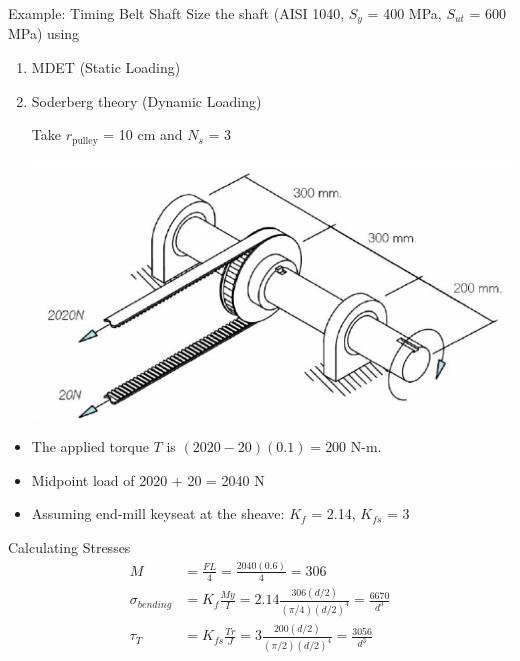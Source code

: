 \documentclass[10pt, svgnames]{beamer}
\begin{document}
\begin{frame}[label={sec:org0fe2dbf}]{Example: Timing Belt Shaft}
Size the shaft (AISI 1040, \(S_y\) = 400 MPa, \(S_{ut}\) = 600 MPa) using

\begin{enumerate}
\item MDET (Static Loading)
\item Soderberg theory (Dynamic Loading)

Take \(r_{\text{pulley}}\) = 10 cm and \(N_{s}\) = 3

\begin{center}
\includegraphics[width=.9\linewidth]{./Pictures/shaft-sizing.png}
\end{center}
\end{enumerate}
\end{frame}

\begin{frame}[label={sec:orga3b396e}]{}
\begin{itemize}
\item The applied torque \(T\) is \((2020 - 20)(0.1) = 200\) N-m.
\item Midpoint load of 2020 + 20 = 2040 N
\item Assuming end-mill keyseat at the sheave: \(K_{f}\) = 2.14, \(K_{fs}\) = 3
\end{itemize}
\end{frame}

\begin{frame}[label={sec:orgf2a7c2e}]{Calculating Stresses}
\begin{align*}
  M &= \frac{FL}{4} = \frac{2040(0.6)}{4} = 306 \\
  \sigma_{bending} &= K_{f}\frac{My}{I} = 2.14 \frac{306(d/2)}{(\pi/4) (d/2)^{4}} = \frac{6670}{d^{3}} \\
  \tau_{T} &= K_{fs}\frac{Tr}{J} = 3 \frac{200(d/2)}{(\pi/2)(d/2)^{4}} = \frac{3056}{d^{3}}
\end{align*}
\end{frame}
\end{document}
